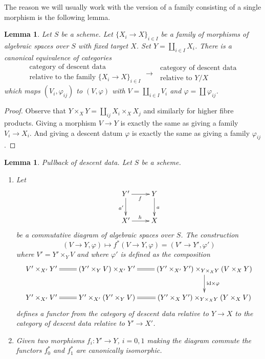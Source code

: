 \documentclass{stacks-project}
\theoremstyle{plain}
\newtheorem{lemma}[subsection]{Lemma}
\theoremstyle{definition}
\theoremstyle{remark}
\numberwithin{equation}{subsection}
\begin{document}
\noindent
The reason we will usually work with the version of a family consisting
of a single morphism is the following lemma.

\begin{lemma}
\label{lemma-family-is-one}
Let $S$ be a scheme.
Let $\{X_i \to X\}_{i \in I}$ be a family of morphisms
of algebraic spaces over $S$ with fixed target $X$.
Set $Y = \coprod_{i \in I} X_i$.
There is a canonical equivalence of categories
$$
\begin{matrix}
\text{category of descent data } \\
\text{relative to the family } \{X_i \to X\}_{i \in I}
\end{matrix}
\longrightarrow
\begin{matrix}
\text{ category of descent data} \\
\text{ relative to } Y/X
\end{matrix}
$$
which maps $(V_i, \varphi_{ij})$ to $(V, \varphi)$ with
$V = \coprod_{i\in I} V_i$ and $\varphi = \coprod \varphi_{ij}$.
\end{lemma}

\begin{proof}
Observe that $Y \times_X Y = \coprod_{ij} X_i \times_X X_j$
and similarly for higher fibre products.
Giving a morphism $V \to Y$ is exactly the same as
giving a family $V_i \to X_i$. And giving a descent datum
$\varphi$ is exactly the same as giving a family $\varphi_{ij}$.
\end{proof}

\begin{lemma}
\label{lemma-pullback}
Pullback of descent data. Let $S$ be a scheme.
\begin{enumerate}
\item Let
$$
\xymatrix{
Y' \ar[r]_f \ar[d]_{a'} & Y \ar[d]^a \\
X' \ar[r]^h & X
}
$$
be a commutative diagram of algebraic spaces over $S$.
The construction
$$
(V \to Y, \varphi) \longmapsto f^*(V \to Y, \varphi) = (V' \to Y', \varphi')
$$
where $V' = Y' \times_Y V$ and where
$\varphi'$ is defined as the composition
$$
\xymatrix{
V' \times_{X'} Y' \ar@{=}[r] &
(Y' \times_Y V) \times_{X'} Y' \ar@{=}[r] &
(Y' \times_{X'} Y') \times_{Y \times_X Y} (V \times_X Y)
\ar[d]^{\text{id} \times \varphi} \\
Y' \times_{X'} V' \ar@{=}[r] &
Y' \times_{X'} (Y' \times_Y V) &
(Y' \times_X Y') \times_{Y \times_X Y} (Y \times_X V) \ar@{=}[l]
}
$$
defines a functor from the category of descent data
relative to $Y \to X$ to the category of descent data
relative to $Y' \to X'$.
\item Given two morphisms $f_i : Y' \to Y$, $i = 0, 1$ making the
diagram commute the functors $f_0^*$ and $f_1^*$ are
canonically isomorphic.
\end{enumerate}
\end{lemma}
\end{document}
